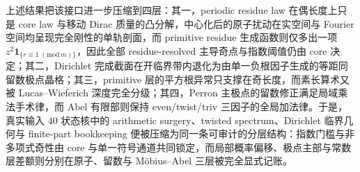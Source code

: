 


上述结果把该接口进一步压缩到四层：其一，periodic residue law 在偶长度上只是 core law 与移动 Dirac 质量的凸分解，中心化后的原子扰动在实空间与 Fourier 空间均呈现完全刚性的单轨剖面，而 primitive residue 生成函数则仅多出一项 \(z^2\mathbf 1_{\{r\equiv 1\;(\mathrm{mod}\,m)\}}\)，因此全部 residue-resolved 主导奇点与指数阈值仍由 core 决定；其二，Dirichlet 完成截面在开临界带内退化为由单一负根因子生成的等距同留数极点晶格；其三，primitive 层的平方根异常只支撑在奇长度，而素长算术又被 Lucas--Wieferich 深度完全分级；其四，Perron 主极点的留数修正满足局域乘法手术律，而 Abel 有限部则保持 even/twist/triv 三因子的全局加法律。于是，真实输入 \(40\) 状态核中的 arithmetic surgery、twisted spectrum、Dirichlet 临界几何与 finite-part bookkeeping 便被压缩为同一条可审计的分层结构：指数门槛与非多项式奇性由 core 与单一符号通道共同锁定，而局部概率偏移、极点主部与常数层差额则分别在原子、留数与 M\"obius--Abel 三层被完全显式记账。

\endinput

